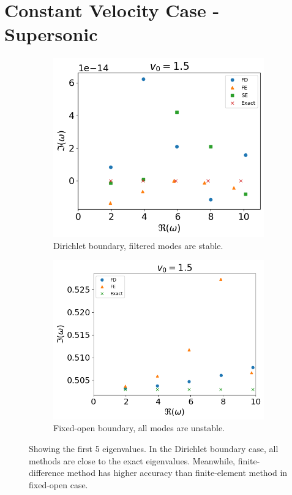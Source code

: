 \section{Constant Velocity Case - Supersonic}
\begin{figure}[H]
  \begin{subfigure}{0.45\textwidth}
    \centering
    \includegraphics[width=0.9\linewidth]{figures/numerical-experiments/fixed-fixed/constant-v-v0=1.5}
    \caption{Dirichlet boundary, filtered modes are stable.}
  \end{subfigure}%
  \begin{subfigure}{0.45\textwidth}
    \includegraphics[width=\linewidth]{figures/numerical-experiments/fixed-open/constant-v-v0=1.5}
    \caption{Fixed-open boundary, all modes are unstable.}
  \end{subfigure}
  \caption{Showing the first 5 eigenvalues. In the Dirichlet boundary case, all methods are close to the exact eigenvalues. Meanwhile, finite-difference method has higher accuracy than finite-element method in fixed-open case.}
  \label{fig:constant-v-supersonic}
\end{figure}

